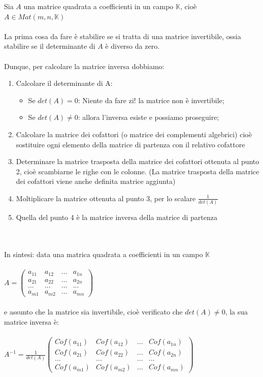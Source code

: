 \documentclass{report}
\begin{document}
Sia $A$ una matrice quadrata a coefficienti in un campo $\mathbb{K}$, cioè $A \in Mat(m,n,\mathbb{K})$
\\
\\
La prima cosa da fare è stabilire se si tratta di una matrice invertibile, ossia stabilire se il determinante di $A$ è diverso da zero.
\\
\\
Dunque, per calcolare la matrice inversa dobbiamo:
\\
\begin{enumerate}
  \item{Calcolare il determinante di A:
      \begin{itemize}
        \item Se $det(A) = 0$: Niente da fare zi! la matrice non è invertibile;
        \item Se $det(A) \neq 0$: allora l'inversa esiste e possiamo proseguire;
      \end{itemize}
    }
  \item Calcolare la matrice dei cofattori (o matrice dei complementi algebrici) cioè sostituire ogni elemento della matrice di partenza con il relativo cofattore 
  \item Determinare la matrice trasposta della matrice dei cofattori ottenuta al punto 2, cioè scambiarne le righe con le colonne. (La matrice trasposta della matrice dei cofattori viene anche definita matrice aggiunta)
  \item Moltiplicare la matrice ottenuta al punto 3, per lo scalare $\frac{1}{det(A)}$
  \item Quella del punto 4 è la matrice inversa della matrice di partenza
\end{enumerate}
\\
\\
In sintesi: data una matrica quadrata a coefficienti in un campo $\mathbb{K}$ 
\\
\\
$
A=\begin{pmatrix}
  a_{11} & a_{12} & ... & a_{1n} \\
  a_{21} & a_{22} & ... & a_{2n} \\
  ... & ... & ... & ... \\
  a_{m1} & a_{m2} & ... & a_{mn}
\end{pmatrix}
$
\\
\\
e assunto che la matrice sia invertibile, cioè verificato che $det(A) \neq 0$, la sua matrice inversa è: 
\\
\\
$
A^{-1}=\frac{1}{det(A)}\begin{pmatrix}
  Cof(a_{11}) & Cof(a_{12}) & ... & Cof(a_{1n}) \\
  Cof(a_{21}) & Cof(a_{22}) & ... & Cof(a_{2n}) \\
  ... & ... & ... & ... \\
  Cof(a_{m1}) & Cof(a_{m2}) & ... & Cof(a_{mn})
\end{pmatrix}
$
\end{document}
